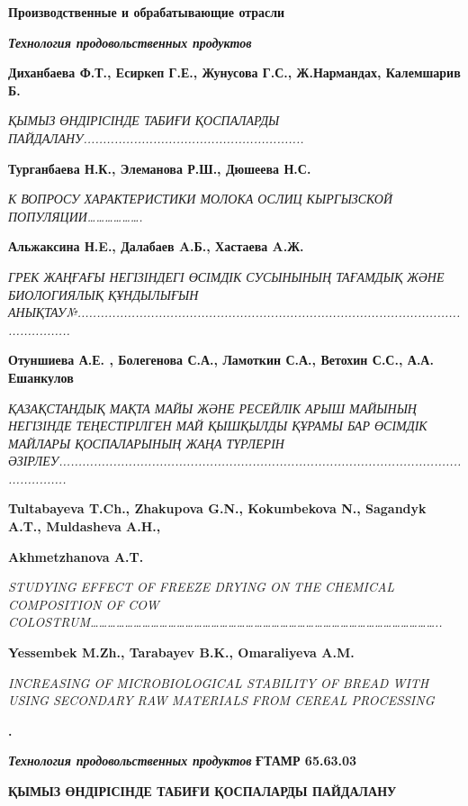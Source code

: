 {\bfseries Производственные и обрабатывающие отрасли}

{\bfseries \emph{Технология продовольственных продуктов}}

{\bfseries Диханбаева Ф.Т., Есиркеп Г.Е., Жунусова Г.С., Ж.Нармандах,
Калемшарив Б.}

\emph{ҚЫМЫЗ ӨНДІРІСІНДЕ ТАБИҒИ ҚОСПАЛАРДЫ
ПАЙДАЛАНУ.........................................................}

{\bfseries Турганбаева Н.К., Элеманова Р.Ш., Дюшеева Н.С.}

\emph{К ВОПРОСУ ХАРАКТЕРИСТИКИ МОЛОКА ОСЛИЦ КЫРГЫЗСКОЙ
ПОПУЛЯЦИИ\ldots\ldots\ldots\ldots\ldots\ldots.}

{\bfseries Альжаксина Н.E., Далабаев A.Б., Хастаева A.Ж.}

\emph{ГРЕК ЖАҢҒАҒЫ НЕГІЗІНДЕГІ ӨСІМДІК СУСЫНЫНЫҢ ТАҒАМДЫҚ ЖӘНЕ
БИОЛОГИЯЛЫҚ ҚҰНДЫЛЫҒЫН
АНЫҚТАУ№...................................................................................................................}

{\bfseries Отуншиева А.Е. , Болегенова С.А., Ламоткин С.А., Ветохин С.С.,
А.А. Ешанкулов}

\emph{ҚАЗАҚСТАНДЫҚ МАҚТА МАЙЫ ЖӘНЕ РЕСЕЙЛІК АРЫШ МАЙЫНЫҢ НЕГІЗІНДЕ
ТЕҢЕСТІРІЛГЕН МАЙ ҚЫШҚЫЛДЫ ҚҰРАМЫ БАР ӨСІМДІК МАЙЛАРЫ ҚОСПАЛАРЫНЫҢ ЖАҢА
ТҮРЛЕРІН
ӘЗІРЛЕУ.......................................................................................................................}

{\bfseries Tultabayeva T.Ch., Zhakupova G.N., Kokumbekova N., Sagandyk
A.T., Muldasheva A.H.,}

{\bfseries Akhmetzhanova A.T.}

\emph{STUDYING EFFECT OF FREEZE DRYING ON THE CHEMICAL COMPOSITION OF
COW
COLOSTRUM\ldots\ldots\ldots\ldots\ldots\ldots\ldots\ldots\ldots\ldots\ldots\ldots\ldots\ldots\ldots\ldots\ldots\ldots\ldots\ldots\ldots\ldots\ldots\ldots\ldots\ldots\ldots\ldots\ldots\ldots\ldots\ldots\ldots\ldots\ldots\ldots\ldots\ldots\ldots\ldots..}

{\bfseries Yessembek M.Zh., Tarabayev B.K., Omaraliyeva A.M.}

\emph{INCREASING OF MICROBIOLOGICAL STABILITY OF BREAD WITH USING
SECONDARY RAW MATERIALS FROM CEREAL PROCESSING}

{\bfseries .}

{\bfseries \emph{Технология продовольственных продуктов}}\newpage
{\bfseries ҒТАМР 65.63.03}

{\bfseries ҚЫМЫЗ ӨНДІРІСІНДЕ ТАБИҒИ ҚОСПАЛАРДЫ ПАЙДАЛАНУ}

